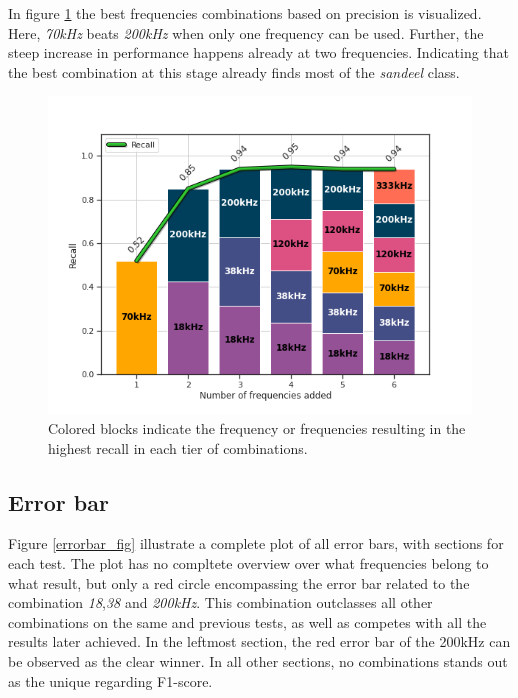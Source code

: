         In figure \ref{increasing_freq_recall_score_fig} the best frequencies combinations based on precision is visualized. Here, \textit{70kHz} beats \textit{200kHz} when only one frequency can be used. Further, the steep increase in performance happens already at two frequencies. Indicating that the best combination at this stage already finds most of the \textit{sandeel} class.
        \begin{figure}[H]
            \centering
            \includegraphics[scale=0.7]{figures/increasing_freq_recall.png}
            \caption[Best frequency combination - Recall]{Colored blocks indicate the frequency or frequencies resulting in the highest recall in each tier of combinations.}
          	\medskip 
            \label{increasing_freq_recall_score_fig}
        \end{figure}

    \subsection{Error bar}
        Figure \ref{errorbar_fig} illustrate a complete plot of all error bars, with sections for each test. The plot has no compltete overview over what frequencies belong to what result, but only a red circle encompassing the error bar related to the combination \textit{18},\textit{38} and \textit{200kHz}. This combination outclasses all other combinations on the same and previous tests, as well as competes with all the results later achieved. In the leftmost section, the red error bar of the 200kHz can be observed as the clear winner. In all other sections, no combinations stands out as the unique regarding F1-score.
        
